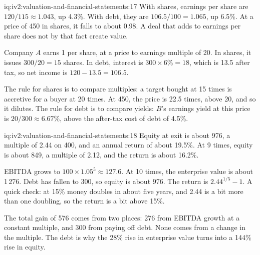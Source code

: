 \begin{solution}{iq:iv2:valuation-and-financial-statements:17}
With shares, earnings per share are $120/115 \approx 1.043$, up 4.3\%. With debt, they are $106.5/100 = 1.065$, up 6.5\%. At a price of 450 in shares, it falls to about 0.98. A deal that adds to earnings per share does not by that fact create value.

Company $A$ earns 1 per share, at a price to earnings multiple of 20. In shares, it issues $300/20 = 15$ shares. In debt, interest is $300 \times 6\% = 18$, which is 13.5 after tax, so net income is $120 - 13.5 = 106.5$.

The rule for shares is to compare multiples: a target bought at 15 times is accretive for a buyer at 20 times. At 450, the price is 22.5 times, above 20, and so it dilutes. The rule for debt is to compare yields: $B$'s earnings yield at this price is $20/300 \approx 6.67\%$, above the after-tax cost of debt of 4.5\%.

\end{solution}

\begin{solution}{iq:iv2:valuation-and-financial-statements:18}
Equity at exit is about 976, a multiple of 2.44 on 400, and an annual return of about 19.5\%. At 9 times, equity is about 849, a multiple of 2.12, and the return is about 16.2\%.

EBITDA grows to $100 \times 1.05^5 \approx 127.6$. At 10 times, the enterprise value is about 1\,276. Debt has fallen to 300, so equity is about 976. The return is $2.44^{1/5} - 1$. A quick check: at 15\% money doubles in about five years, and 2.44 is a bit more than one doubling, so the return is a bit above 15\%.

The total gain of 576 comes from two places: 276 from EBITDA growth at a constant multiple, and 300 from paying off debt. None comes from a change in the multiple. The debt is why the 28\% rise in enterprise value turns into a 144\% rise in equity.

\end{solution}

